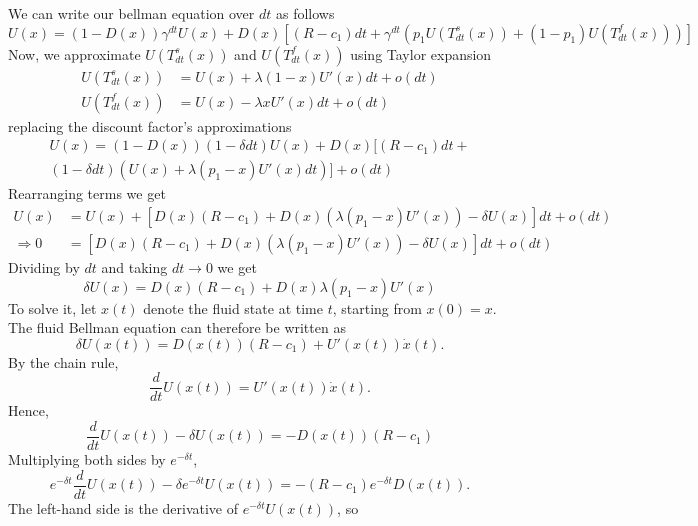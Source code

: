 \documentclass[11pt]{article}
\begin{document}
We can write our bellman equation over $dt$ as follows
\begin{equation}
  U(x) = (1-D(x)) \gamma^{dt} U(x)+ D(x)[ (R-c_1)dt + \gamma^{dt}(p_1U(T^s_{dt}(x)) + (1-p_1)U(T^f_{dt}(x)))]
\end{equation}
Now, we approximate $U(T^s_{dt}(x))$ and $U(T^f_{dt}(x))$ using Taylor expansion
\begin{align}
  U(T^s_{dt}(x)) &= U(x) + \lambda(1-x)U'(x)dt + o(dt) \\
  U(T^f_{dt}(x)) &= U(x) - \lambda x U'(x)dt + o(dt) 
\end{align}
replacing the discount factor's approximations 
\begin{align}
  U(x) = (1-D(x))(1-\delta dt)U(x) + D(x)[(R-c_1)dt + \\(1-\delta dt)(U(x) + \lambda(p_1-x)U'(x)dt) ]+ o(dt)
\end{align}
Rearranging terms we get
\begin{align}
  U(x) &= U(x) + [D(x)(R-c_1) + D(x) (\lambda (p_1-x)U'(x))-\delta U(x)]dt  + o(dt)\\ 
  \Rightarrow 0 &= [D(x)(R-c_1) + D(x) (\lambda (p_1-x)U'(x))-\delta U(x)]dt  + o(dt)
\end{align}
Dividing by $dt$ and taking $dt \rightarrow 0$ we get
\begin{equation}
  \delta U(x) = D(x)(R-c_1) + D(x)\lambda (p_1-x)U'(x)
\end{equation}
To solve it, let $x(t)$ denote the fluid state at time $t$, starting from $x(0)=x$. The fluid Bellman equation can therefore be written as
\begin{equation}
    \delta U(x(t))=D(x(t))(R-c_1)+U'(x(t))\dot{x}(t).
\end{equation}
By the chain rule,
\begin{equation}
    \frac{d}{dt}U(x(t))=U'(x(t))\dot{x}(t).
\end{equation}
Hence,
\begin{equation}
    \frac{d}{dt}U(x(t)) - \delta U(x(t)) = -D(x(t))(R-c_1) 
\end{equation}
Multiplying both sides by $e^{-\delta t}$,
\begin{equation}
    e^{-\delta t}\frac{d}{dt}U(x(t))-\delta e^{-\delta t}U(x(t))=-(R-c_1)e^{-\delta t}D(x(t)).
\end{equation}
The left-hand side is the derivative of $e^{-\delta t}U(x(t))$, so
\end{document}
